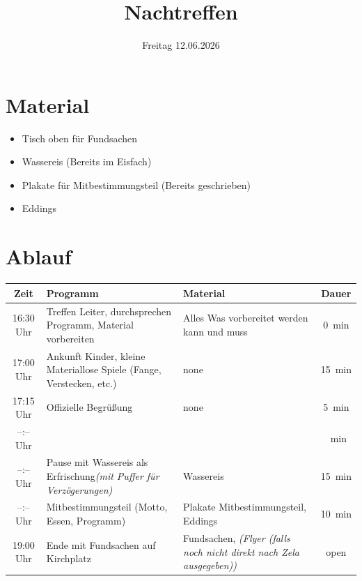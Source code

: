 \documentclass[11pt]{scrartcl}
\title{Nachtreffen}
\subtitle{Freitag 12.06.2026}
\author{}
\date{}
\begin{document}
\maketitle \thispagestyle{empty}
\section{Material}
\begin{itemize}
  \item Tisch oben für Fundsachen
  \item Wassereis (Bereits im Eisfach)
  \item Plakate für Mitbestimmungsteil (Bereits geschrieben)
  \item Eddings
\end{itemize}
\section{Ablauf}

\begin{tabularx}{\textwidth}{|c|X|X|c|}\hline
\textbf{Zeit}&\textbf{Programm}&\textbf{Material}&\textbf{Dauer}\\\hline
    16:30 Uhr&Treffen Leiter, durchsprechen Programm, Material vorbereiten&Alles Was vorbereitet werden kann und muss&\qty{0}{\minute}\\\hline
    17:00 Uhr&Ankunft Kinder, kleine Materiallose Spiele (Fange, Verstecken, etc.)&none&\qty{15}{\minute}\\\hline
    17:15 Uhr&Offizielle Begrüßung&none&\qty{5}{\minute}\\\hline
    --:-- Uhr&&&\qty{}{\minute}\\\hline
    --:-- Uhr&Pause mit Wassereis als Erfrischung\newline\textit{(mit Puffer für Verzögerungen)}&Wassereis&\qty{15}{\minute}\\\hline
    --:-- Uhr&Mitbestimmungsteil (Motto, Essen, Programm)&Plakate Mitbestimmungsteil, Eddings&\qty{10}{\minute}\\\hline
    19:00 Uhr&Ende mit Fundsachen auf Kirchplatz&Fundsachen, \textit{(Flyer (falls noch nicht direkt nach Zela ausgegeben))}&open\\\hline
\end{tabularx}
\end{document}
